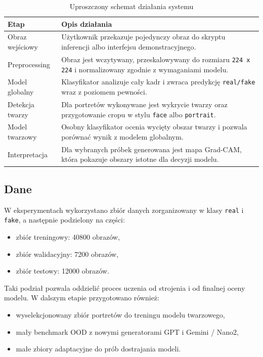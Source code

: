 \begin{table}[H]
\centering
\caption{Uproszczony schemat działania systemu}
\label{tab:pipeline}
\begin{tabular}{|L{3.2cm}|L{9.2cm}|}
\hline
\textbf{Etap} & \textbf{Opis działania} \\
\hline
Obraz wejściowy & Użytkownik przekazuje pojedynczy obraz do skryptu inferencji albo interfejsu demonstracyjnego. \\
\hline
Preprocessing & Obraz jest wczytywany, przeskalowywany do rozmiaru \texttt{224 x 224} i normalizowany zgodnie z wymaganiami modelu. \\
\hline
Model globalny & Klasyfikator analizuje cały kadr i zwraca predykcję \texttt{real/fake} wraz z poziomem pewności. \\
\hline
Detekcja twarzy & Dla portretów wykonywane jest wykrycie twarzy oraz przygotowanie cropu w stylu \texttt{face} albo \texttt{portrait}. \\
\hline
Model twarzowy & Osobny klasyfikator ocenia wycięty obszar twarzy i pozwala porównać wynik z modelem globalnym. \\
\hline
Interpretacja & Dla wybranych próbek generowana jest mapa Grad-CAM, która pokazuje obszary istotne dla decyzji modelu. \\
\hline
\end{tabular}
\end{table}

\subsection{Dane}

W eksperymentach wykorzystano zbiór danych zorganizowany w klasy \texttt{real} i \texttt{fake}, a następnie podzielony na części:

\begin{itemize}
    \item zbiór treningowy: 40800 obrazów,
    \item zbiór walidacyjny: 7200 obrazów,
    \item zbiór testowy: 12000 obrazów.
\end{itemize}

Taki podział pozwala oddzielić proces uczenia od strojenia i od finalnej oceny modelu.
\newpage
W dalszym etapie przygotowano również:

\begin{itemize}
    \item wyselekcjonowany zbiór portretów do treningu modelu twarzowego,
    \item mały benchmark OOD z nowymi generatorami GPT i Gemini / Nano2,
    \item małe zbiory adaptacyjne do prób dostrajania modeli.
\end{itemize}

